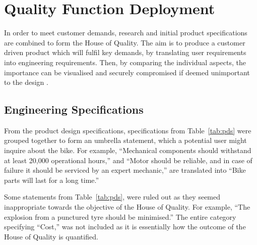 \documentclass[a4paper,11pt]{article}
\begin{document}
\newpage

\section{Quality Function Deployment}

In order to meet customer demands, research and initial product specifications are combined to form the House of Quality. The aim is to produce a customer driven product which will fulfil key demands, by translating user requirements into engineering requirements. Then, by comparing the individual aspects, the importance can be visualised and securely compromised if deemed unimportant to the design \cite{fran01}.

\subsection{Engineering Specifications}

From the product design specifications, specifications from Table~\ref{tab:pds} were grouped together to form an umbrella statement, which a potential user might inquire about the bike. For example, ``Mechanical components should withstand at least 20,000 operational hours,'' and ``Motor should be reliable, and in case of failure it should be serviced by an expert mechanic,'' are translated into ``Bike parts will last for a long time.'' 

Some statements from Table~\ref{tab:pds}, were ruled out as they seemed inappropriate towards the objective of the House of Quality. For example, ``The explosion from a punctured tyre should be minimised.'' The entire category specifying ``Cost,'' was not included as it is essentially how the outcome of the House of Quality is quantified.
\end{document}
